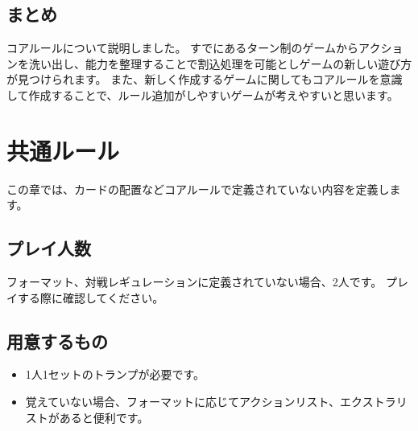 \documentclass[letterpaper,10pt,dvipdfmx]{sphinxmanual}
\begin{document}
\section{まとめ}
\label{\detokenize{core/core:id43}}
\sphinxAtStartPar
コアルールについて説明しました。
すでにあるターン制のゲームからアクションを洗い出し、能力を整理することで割込処理を可能としゲームの新しい遊び方が見つけられます。
また、新しく作成するゲームに関してもコアルールを意識して作成することで、ルール追加がしやすいゲームが考えやすいと思います。

\sphinxstepscope


\chapter{共通ルール}
\label{\detokenize{common/common:id1}}\label{\detokenize{common/common::doc}}
\sphinxAtStartPar
この章では、カードの配置などコアルールで定義されていない内容を定義します。


\section{プレイ人数}
\label{\detokenize{common/common:id2}}
\sphinxAtStartPar
フォーマット、対戦レギュレーションに定義されていない場合、2人です。
プレイする際に確認してください。


\section{用意するもの}
\label{\detokenize{common/common:id3}}\begin{itemize}
\item {} 
\sphinxAtStartPar
1人1セットのトランプが必要です。

\item {} 
\sphinxAtStartPar
覚えていない場合、フォーマットに応じてアクションリスト、エクストラリストがあると便利です。

\end{itemize}
\end{document}
